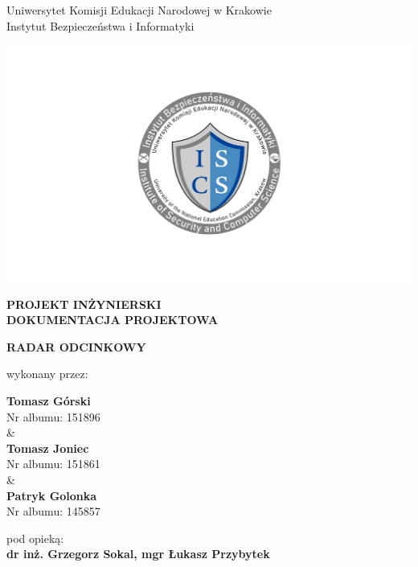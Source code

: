 \documentclass[12pt,a4paper,oneside]{article}
\theoremstyle{definition}
\numberwithin{equation}{section}
\begin{document}

\thispagestyle{empty}
\begin{titlepage}
\begin{center}\Large
Uniwersytet Komisji Edukacji Narodowej w Krakowie\\
\large
Instytut Bezpieczeństwa i Informatyki\\
\vskip 10pt
\end{center}
\begin{center}
\centering \includegraphics[width=1.0\columnwidth]{images/logo.png}
\end{center}

\begin{center}
 {\bf \fontsize{14pt}{14pt}\selectfont PROJEKT INŻYNIERSKI\\ DOKUMENTACJA PROJEKTOWA}
\end{center}
\vskip 5pt
\begin{center}
 {\bf \fontsize{22pt}{22pt}\selectfont RADAR ODCINKOWY}
\end{center}

\begin{center}
 {\fontsize{12pt}{12pt}\selectfont wykonany przez: }
\end{center}
\begin{center}
 {\bf\fontsize{16pt}{16pt}\selectfont Tomasz Górski}\\
 {\fontsize{12pt}{12pt}\selectfont Nr albumu: 151896 \\\&\\}
 {\bf\fontsize{16pt}{16pt}\selectfont Tomasz Joniec}\\
 {\fontsize{12pt}{12pt}\selectfont Nr albumu: 151861\\\&\\}
 {\bf\fontsize{16pt}{16pt}\selectfont Patryk Golonka}\\
 {\fontsize{12pt}{12pt}\selectfont Nr albumu: 145857}
\end{center}
\begin{center}
 {\fontsize{12pt}{12pt}\selectfont pod opieką:}\\
 {\bf\fontsize{12pt}{12pt}\selectfont dr inż. Grzegorz Sokal, mgr Łukasz Przybytek}
\end{center}


\end{titlepage}
\end{document}
